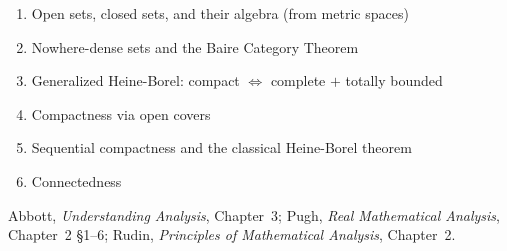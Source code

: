 \begin{enumerate}
  \item Open sets, closed sets, and their algebra (from metric spaces)
  \item Nowhere-dense sets and the Baire Category Theorem
  \item Generalized Heine-Borel: compact $\iff$ complete $+$ totally bounded
  \item Compactness via open covers
  \item Sequential compactness and the classical Heine-Borel theorem
  \item Connectedness
\end{enumerate}

\begin{remark*}
Abbott, \textit{Understanding Analysis}, Chapter~3;
Pugh, \textit{Real Mathematical Analysis}, Chapter~2 \S1--6;
Rudin, \textit{Principles of Mathematical Analysis}, Chapter~2.
\end{remark*}





% 
% 
